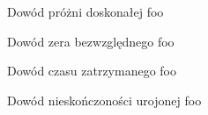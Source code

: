 \begin{easyappendix}{Dowód próżni doskonałej}
	foo
\end{easyappendix}

\begin{easyappendix}{Dowód zera bezwzględnego}
	foo
\end{easyappendix}

\begin{easyappendix}{Dowód czasu zatrzymanego}
	foo
\end{easyappendix}

\begin{easyappendix}{Dowód nieskończoności urojonej}
	foo
\end{easyappendix}
